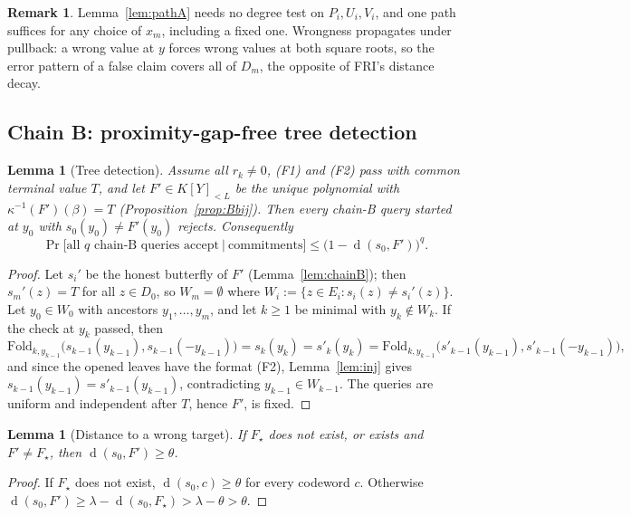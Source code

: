 \documentclass[11pt]{article}
\newtheorem{lemma}[theorem]{Lemma}
\theoremstyle{definition}
\newtheorem{remark}[theorem]{Remark}
\newcommand{\K}{K}
\newcommand{\Fold}{\mathrm{Fold}}
\DeclareMathOperator{\dist}{d}
\begin{document}
\begin{remark}
Lemma~\ref{lem:pathA} needs no degree test on $P_i,U_i,V_i$, and one path suffices for any choice of $x_m$, including a fixed one. Wrongness propagates under pullback: a wrong value at $y$ forces wrong values at both square roots, so the error pattern of a false claim covers all of $D_m$, the opposite of FRI's distance decay.
\end{remark}

\subsection{Chain B: proximity-gap-free tree detection}

\begin{lemma}[Tree detection]\label{lem:treeB}
Assume all $r_k\ne0$, (F1) and (F2) pass with common terminal value $T$, and let $F'\in\K[Y]_{<L}$ be the unique polynomial with $\kappa^{-1}(F')(\beta)=T$ (Proposition~\ref{prop:Bbij}). Then every chain-B query started at $y_0$ with $s_0(y_0)\ne F'(y_0)$ rejects. Consequently
\[
\Pr\big[\text{all $q$ chain-B queries accept}\ \big|\ \text{commitments}\big]\le\big(1-\dist(s_0,F')\big)^q .
\]
\end{lemma}
\begin{proof}
Let $s_i'$ be the honest butterfly of $F'$ (Lemma~\ref{lem:chainB}); then $s_m'(z)=T$ for all $z\in D_0$, so $W_m=\emptyset$ where $W_i:=\{z\in E_i: s_i(z)\ne s_i'(z)\}$. Let $y_0\in W_0$ with ancestors $y_1,\dots,y_m$, and let $k\ge1$ be minimal with $y_k\notin W_k$. If the check at $y_k$ passed, then
\[
\Fold_{k,y_{k-1}}\big(s_{k-1}(y_{k-1}),s_{k-1}(-y_{k-1})\big)=s_k(y_k)=s'_k(y_k)=\Fold_{k,y_{k-1}}\big(s'_{k-1}(y_{k-1}),s'_{k-1}(-y_{k-1})\big),
\]
and since the opened leaves have the format (F2), Lemma~\ref{lem:inj} gives $s_{k-1}(y_{k-1})=s'_{k-1}(y_{k-1})$, contradicting $y_{k-1}\in W_{k-1}$. The queries are uniform and independent after $T$, hence $F'$, is fixed.
\end{proof}

\begin{lemma}[Distance to a wrong target]\label{lem:dist}
If $F_\star$ does not exist, or exists and $F'\ne F_\star$, then $\dist(s_0,F')\ge\theta$.
\end{lemma}
\begin{proof}
If $F_\star$ does not exist, $\dist(s_0,c)\ge\theta$ for every codeword $c$. Otherwise $\dist(s_0,F')\ge\lambda-\dist(s_0,F_\star)>\lambda-\theta>\theta$.
\end{proof}
\end{document}
